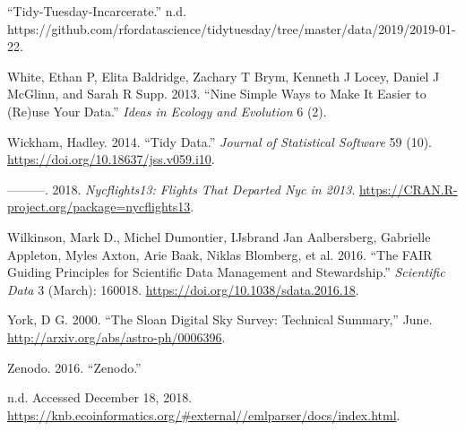 \documentclass[
]{article}
\newlength{\cslhangindent}
\newenvironment{cslreferences}%
  {\setlength{\parindent}{0pt}%
  \everypar{\setlength{\hangindent}{\cslhangindent}}\ignorespaces}%
  {\par}
\begin{document}
\begin{cslreferences}
\leavevmode\hypertarget{ref-tidy-tuesday-incarcerate}{}%
``Tidy-Tuesday-Incarcerate.'' n.d. https://github.com/rfordatascience/tidytuesday/tree/master/data/2019/2019-01-22.

\leavevmode\hypertarget{ref-White2013}{}%
White, Ethan P, Elita Baldridge, Zachary T Brym, Kenneth J Locey, Daniel J McGlinn, and Sarah R Supp. 2013. ``Nine Simple Ways to Make It Easier to (Re)use Your Data.'' \emph{Ideas in Ecology and Evolution} 6 (2).

\leavevmode\hypertarget{ref-Wickham2014}{}%
Wickham, Hadley. 2014. ``Tidy Data.'' \emph{Journal of Statistical Software} 59 (10). \url{https://doi.org/10.18637/jss.v059.i10}.

\leavevmode\hypertarget{ref-nycflights}{}%
---------. 2018. \emph{Nycflights13: Flights That Departed Nyc in 2013}. \url{https://CRAN.R-project.org/package=nycflights13}.

\leavevmode\hypertarget{ref-Wilkinson2016}{}%
Wilkinson, Mark D., Michel Dumontier, IJsbrand Jan Aalbersberg, Gabrielle Appleton, Myles Axton, Arie Baak, Niklas Blomberg, et al. 2016. ``The FAIR Guiding Principles for Scientific Data Management and Stewardship.'' \emph{Scientific Data} 3 (March): 160018. \url{https://doi.org/10.1038/sdata.2016.18}.

\leavevmode\hypertarget{ref-sdss-one-paper}{}%
York, D G. 2000. ``The Sloan Digital Sky Survey: Technical Summary,'' June. \url{http://arxiv.org/abs/astro-ph/0006396}.

\leavevmode\hypertarget{ref-zenodo}{}%
Zenodo. 2016. ``Zenodo.''

\leavevmode\hypertarget{ref-EML-about}{}%
n.d. Accessed December 18, 2018. \url{https://knb.ecoinformatics.org/\#external//emlparser/docs/index.html}.
\end{cslreferences}
\end{document}
